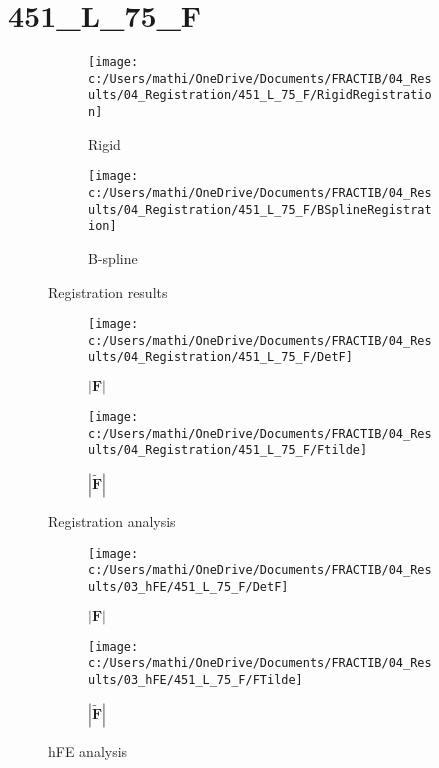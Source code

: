 \documentclass{article}%
\begin{document}
%
\newpage%
\section*{451\_L\_75\_F}%
\label{sec:451L75F}%


\begin{figure}[h!]%
\begin{subfigure}[b]{0.5\linewidth}%
\texttt{[image: c:/Users/mathi/OneDrive/Documents/FRACTIB/04\_Results/04\_Registration/451\_L\_75\_F/RigidRegistration]}%
\caption{Rigid}%
\end{subfigure}%
\begin{subfigure}[b]{0.5\linewidth}%
\texttt{[image: c:/Users/mathi/OneDrive/Documents/FRACTIB/04\_Results/04\_Registration/451\_L\_75\_F/BSplineRegistration]}%
\caption{B{-}spline}%
\end{subfigure}%
\caption{Registration results}%
\end{figure}

%


\begin{figure}[h!]%
\begin{subfigure}[b]{0.5\linewidth}%
\texttt{[image: c:/Users/mathi/OneDrive/Documents/FRACTIB/04\_Results/04\_Registration/451\_L\_75\_F/DetF]}%
\caption{$|\mathbf{F}|$}%
\end{subfigure}%
\begin{subfigure}[b]{0.5\linewidth}%
\texttt{[image: c:/Users/mathi/OneDrive/Documents/FRACTIB/04\_Results/04\_Registration/451\_L\_75\_F/Ftilde]}%
\caption{$|\widetilde{\mathbf{F}}|$}%
\end{subfigure}%
\caption{Registration analysis}%
\end{figure}

%


\begin{figure}[h!]%
\begin{subfigure}[b]{0.5\linewidth}%
\texttt{[image: c:/Users/mathi/OneDrive/Documents/FRACTIB/04\_Results/03\_hFE/451\_L\_75\_F/DetF]}%
\caption{$|\mathbf{F}|$}%
\end{subfigure}%
\begin{subfigure}[b]{0.5\linewidth}%
\texttt{[image: c:/Users/mathi/OneDrive/Documents/FRACTIB/04\_Results/03\_hFE/451\_L\_75\_F/FTilde]}%
\caption{$|\widetilde{\mathbf{F}}|$}%
\end{subfigure}%
\caption{hFE analysis}%
\end{figure}
\end{document}
